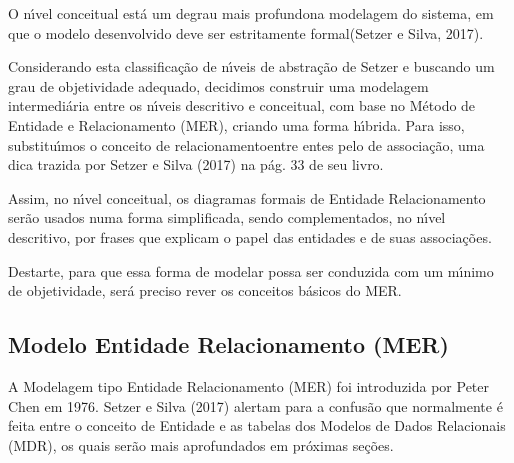 \documentclass[
12pt,		%
openright,	%
twoside,  %
a4paper,			%
chapter=TITLE,		%
english,			%
french,				%
spanish,			%
brazil				%
]{USPSC-classe/USPSC}
\begin{document}
O n\'{\i}vel conceitual est\'a \textquotedbl um degrau mais profundo\textquotedbl  na modelagem do sistema, em que \textquotedbl o modelo desenvolvido deve ser estritamente formal\textquotedbl  (Setzer e Silva, 2017).










Considerando esta classifica\c{c}\~ao de n\'{\i}veis de abstra\c{c}\~ao de Setzer e buscando um grau de objetividade adequado, decidimos construir uma modelagem intermedi\'aria entre os n\'{\i}veis descritivo e conceitual, com base no M\'etodo de Entidade e Relacionamento (MER), criando uma forma h\'{\i}brida. Para isso, substitu\'{\i}mos o conceito de \textquotedbl relacionamento\textquotedbl  entre entes pelo de \textquotedbl associa\c{c}\~ao\textquotedbl , uma dica trazida por  Setzer e Silva (2017) na p\'ag. 33 de seu livro.










Assim, no n\'{\i}vel conceitual, os diagramas formais de Entidade Relacionamento ser\~ao usados numa forma simplificada, sendo complementados, no n\'{\i}vel descritivo, por frases que explicam o papel das entidades e de suas associa\c{c}\~oes.










Destarte, para que essa forma de modelar possa ser conduzida com um m\'{\i}nimo de objetividade, ser\'a preciso rever os conceitos b\'asicos do MER.










\subsection[Modelo Entidade Relacionamento (MER)]{Modelo Entidade Relacionamento (MER)}\label{Modelo Entidade Relacionamento (MER)}
A Modelagem tipo Entidade Relacionamento (MER) foi introduzida por Peter Chen em 1976. Setzer e Silva (2017) alertam para a confus\~ao que normalmente \'e feita entre o conceito de Entidade e as tabelas dos Modelos de Dados Relacionais (MDR), os quais ser\~ao mais aprofundados em pr\'oximas se\c{c}\~oes.
\end{document}
